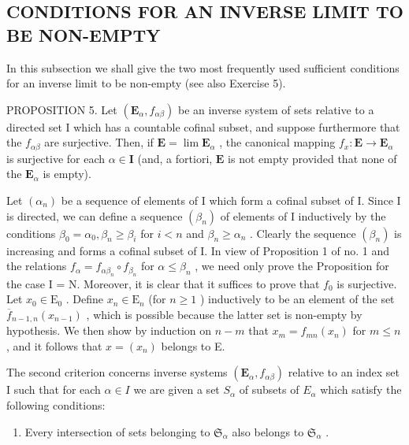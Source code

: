 \subsection{CONDITIONS FOR AN INVERSE LIMIT TO BE NON-EMPTY}

In this subsection we shall give the two most frequently used sufficient conditions for an inverse limit to be non-empty (see also Exercise 5).

PROPOSITION 5. Let \((\mathbf{E}_{\alpha}, f_{\alpha \beta})\) be an inverse system of sets relative to a directed set I which has a countable cofinal subset, and suppose furthermore that the \(f_{\alpha \beta}\) are surjective. Then, if \(\mathbf{E} = \lim \mathbf{E}_{\alpha}\) , the canonical mapping \(f_{x}: \mathbf{E} \to \mathbf{E}_{\alpha}\) is surjective for each \(\alpha \in \mathbf{I}\) (and, a fortiori, \(\mathbf{E}\) is not empty provided that none of the \(\mathbf{E}_{\alpha}\) is empty).

Let \((\alpha_{n})\) be a sequence of elements of I which form a cofinal subset of I. Since I is directed, we can define a sequence \((\beta_{n})\) of elements of I inductively by the conditions \(\beta_{0} = \alpha_{0}, \beta_{n} \geqslant \beta_{i}\) for \(i < n\) and \(\beta_{n} \geqslant \alpha_{n}\) . Clearly the sequence \((\beta_{n})\) is increasing and forms a cofinal subset of I. In view of Proposition 1 of no. 1 and the relations \(f_{\alpha} = f_{\alpha \beta_{n}} \circ f_{\beta_{n}}\) for \(\alpha \leqslant \beta_{n}\) , we need only prove the Proposition for the case I = N. Moreover, it is clear that it suffices to prove that \(f_{0}\) is surjective. Let \(x_{0} \in \mathrm{E}_{0}\) . Define \(x_{n} \in \mathrm{E}_{n}\) (for \(n \geqslant 1\) ) inductively to be an element of the set \(\overline{f}_{n-1,n}(x_{n-1})\) , which is possible because the latter set is non-empty by hypothesis. We then show by induction on \(n - m\) that \(x_{m} = f_{mn}(x_{n})\) for \(m \leqslant n\) , and it follows that \(x = (x_{n})\) belongs to E.

The second criterion concerns inverse systems \((\mathbf{E}_{\alpha}, f_{\alpha\beta})\) relative to an index set I such that for each \(\alpha \in I\) we are given a set \(S_{\alpha}\) of subsets of \(E_{\alpha}\) which satisfy the following conditions:

\begin{enumerate}
\def\labelenumi{(\roman{enumi})}
\tightlist
\item
  Every intersection of sets belonging to \(\mathfrak{S}_{\alpha}\) also belongs to \(\mathfrak{S}_{\alpha}\) .
\end{enumerate}

